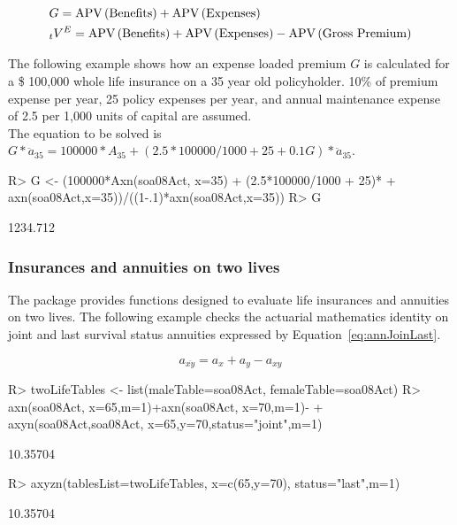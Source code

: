 \documentclass[nojss]{jss}
\begin{document}
\begin{equation}
\begin{gathered}
  G = \text{APV}\left(\text{Benefits}\right) + \text{APV}\left(\text{Expenses}\right) \hfill \\
 {}_{t}V^{E} = \text{APV} \left(\text{Benefits}\right) + \text{APV} \left(\text{Expenses}\right) - \text{APV} \left(\text{Gross Premium}\right)	\hfill \\ 
\end{gathered}
\label{eq:ExpenseLoad}
\end{equation}

The following example shows how an expense loaded premium $G$ is calculated for a \$ 100,000 whole life insurance on a 35 year old policyholder. 10\% of premium expense per year, 25 policy expenses per year, and annual maintenance expense of 2.5 per
1,000 units of capital are assumed.\\

The equation to be solved is $G * \ddot{a}_{35} = 100000 * A_{35} + \left( 2.5*100000/1000 + 25 + 0.1 G \right) * \ddot{a}_{35}$.
\begin{Schunk}
\begin{Sinput}
R> G <- (100000*Axn(soa08Act, x=35) + (2.5*100000/1000 + 25)*
+  			axn(soa08Act,x=35))/((1-.1)*axn(soa08Act,x=35))
R> G
\end{Sinput}
\begin{Soutput}
[1] 1234.712
\end{Soutput}
\end{Schunk}



\subsubsection{Insurances and annuities on two lives}\label{sec:ssstwoheads}

The package provides functions designed to evaluate life insurances and annuities
on two lives.
The following example checks the actuarial mathematics identity on joint and last survival status annuities 
expressed by Equation~\ref{eq:annJoinLast}.

\begin{equation}
  a_{\overline{xy}}= a_{x} + a_{y} - a_{xy}
\label{eq:annJoinLast}
\end{equation}






\begin{Schunk}
\begin{Sinput}
R> twoLifeTables <- list(maleTable=soa08Act, femaleTable=soa08Act)
R> axn(soa08Act, x=65,m=1)+axn(soa08Act, x=70,m=1)-
+  axyn(soa08Act,soa08Act,	x=65,y=70,status="joint",m=1) 
\end{Sinput}
\begin{Soutput}
[1] 10.35704
\end{Soutput}
\begin{Sinput}
R> axyzn(tablesList=twoLifeTables, x=c(65,y=70), status="last",m=1)
\end{Sinput}
\begin{Soutput}
[1] 10.35704
\end{Soutput}
\end{Schunk}
\end{document}
